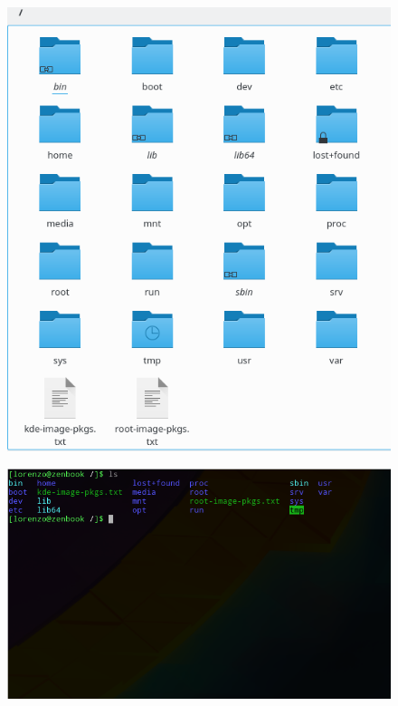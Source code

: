 \begin{figure} [ht]
	\centering
	\includegraphics[scale=0.3]{Immagini/dir_graph.png}  
	\caption{}
	\label{dirgraph}
\end{figure}
\begin{figure} [ht]
	\centering
	\includegraphics[scale=0.45]{Immagini/dir_ter.png}  
	\caption{}
	\label{dirter}
\end{figure}

